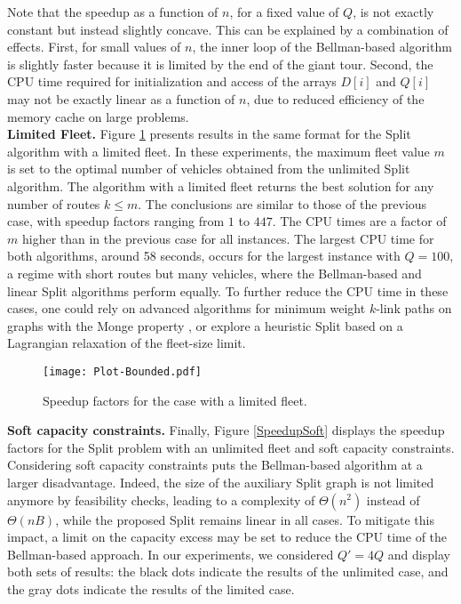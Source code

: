 \documentclass[11pt]{article}
\newcommand{\blue}[1]{{#1}}
\begin{document}
Note that the speedup as a function of $n$, for a fixed value of $Q$, is not exactly constant but instead slightly concave. This can be explained by a combination of effects. First, for small values of $n$, the inner loop of the Bellman-based algorithm is slightly faster because it is limited by the end of the giant tour. Second, the CPU time required for initialization and access of the arrays $D[i]$ and $Q[i]$ may not be exactly linear as a function of $n$, due to reduced efficiency of the memory cache on large problems. \\

\textbf{Limited Fleet.}
Figure \ref{SpeedupBounded} presents results in the same format for the Split algorithm with a limited fleet. In these experiments, the maximum fleet value $m$ is set to the optimal number of vehicles obtained from the unlimited Split algorithm. The algorithm with a limited fleet returns the best solution for any number of routes $k \leq m$.
The conclusions are similar to those of the previous case, with speedup factors ranging from $1$ to $447$. The CPU times are a factor of $m$ higher than in the previous case for all instances.
The largest CPU time for both algorithms, around 58 seconds, occurs for the largest instance with $Q=100$, a regime with short routes but many vehicles, where the Bellman-based and linear Split algorithms perform equally. 
To further reduce the CPU time in these cases, one could rely on advanced algorithms for minimum weight $k$-link paths on graphs with the Monge property \citep{Aggarwal1994}, or explore a heuristic Split based on a Lagrangian relaxation of the fleet-size limit. \\

\begin{figure}[htbp]
\centering
\texttt{[image: Plot-Bounded.pdf]}
\caption{Speedup factors for the case with a limited fleet.}
\label{SpeedupBounded}
\end{figure}

\pagebreak

\textbf{Soft capacity constraints.}
Finally, Figure \ref{SpeedupSoft} displays the speedup factors for the Split problem with an unlimited fleet and soft capacity constraints.
\blue{Considering soft capacity constraints puts the Bellman-based algorithm at a larger disadvantage. Indeed, the size of the auxiliary Split graph is not limited anymore by feasibility checks, leading to a complexity of $\Theta(n^2)$ instead of $\Theta(nB)$, while the proposed Split remains linear in all cases. To mitigate this impact, a limit on the capacity excess may be set to reduce the CPU time of the Bellman-based approach. In our experiments, we considered $Q' = 4Q$ and display both sets of results}: the black dots indicate the results of the unlimited case, and the gray dots indicate the results of the limited case.
\end{document}
